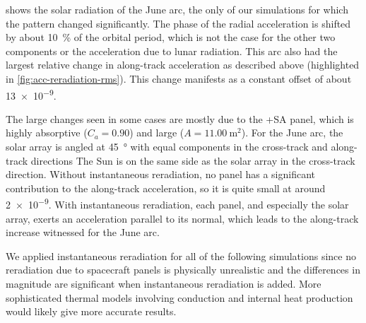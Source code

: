  shows the solar radiation of the June arc, the only of our simulations for which the pattern changed significantly. The phase of the radial acceleration is shifted by about \qty{10}{\percent} of the orbital period, which is not the case for the other two components or the acceleration due to lunar radiation. This arc also had the largest relative change in along-track acceleration as described above (highlighted in \cref{fig:acc-reradiation-rms}). This change manifests as a constant offset of about \qty{13e-9}{\acc}. 

The large changes seen in some cases are mostly due to the +SA panel, which is highly absorptive ($C_a = 0.90$) and large ($A = \qty{11.00}{\m\squared}$). For the June arc, the solar array is angled at \qty{45}{\degree} with equal components in the cross-track and along-track directions The Sun is on the same side as the solar array in the cross-track direction. Without instantaneous reradiation, no panel has a significant contribution to the along-track acceleration, so it is quite small at around \qty{2e-9}{\acc}. With instantaneous reradiation, each panel, and especially the solar array, exerts an acceleration parallel to its normal, which leads to the along-track increase witnessed for the June arc.

We applied instantaneous reradiation for all of the following simulations since no reradiation due to spacecraft panels is physically unrealistic and the differences in magnitude are significant when instantaneous reradiation is added. More sophisticated thermal models involving conduction and internal heat production would likely give more accurate results.











